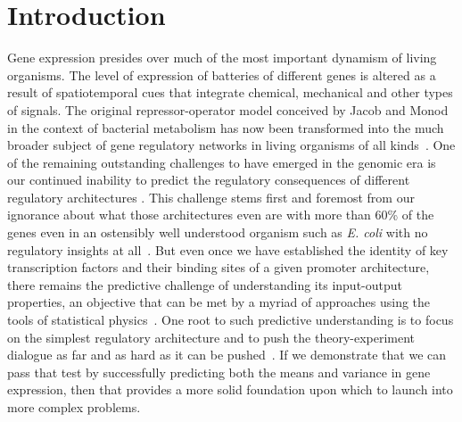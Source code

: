 \section{Introduction}

Gene expression presides over much of the most important dynamism of living
organisms.   The level of expression of batteries of different genes is altered
as a result of spatiotemporal cues that integrate chemical, mechanical and other
types of signals.  The original repressor-operator model conceived by Jacob and
Monod in the context of bacterial metabolism has now been transformed into the
much broader subject of gene regulatory networks in living organisms of all
kinds~\cite{Jacob1961, Britten1969, Ben-TabouDe-Leon2007}.  One of the remaining
outstanding challenges to have emerged in the genomic era is our continued
inability to predict the regulatory consequences of different regulatory
architectures . This challenge stems first and foremost from
our ignorance about what those architectures even are with more than 60\% of the
genes even in an ostensibly well understood organism such as  {\it E. coli} with
no regulatory insights at all~\cite{Rydenfelt2014-2,Belliveau2018,Ghatak2019,
Santos_Zavaleta2019}. But even once we have established the identity of key
transcription factors and their binding sites of a given promoter architecture,
there remains the predictive challenge of understanding its input-output
properties, an objective that can be met by a myriad of approaches using the
tools of statistical physics~\cite{Ackers1982, Shea1985,
Buchler2003,Vilar2003a,Vilar2003b, Bintu2005a,Bintu2005c, Gertz2009,Sherman2012,
Saiz2013, Ko1991,Peccoud1995,Record1996, Kepler2001,
Sanchez2008,Shahrezaei2008,Sanchez2011, Michel2010}.  One root to such
predictive understanding is to focus on the simplest regulatory architecture and
to push the theory-experiment dialogue as far and as hard as it can be
pushed~\cite{Phillips2019}.  If we demonstrate that we can pass that test by
successfully predicting both the means and variance in gene expression, then
that provides a more solid foundation upon which to launch into more complex
problems.

